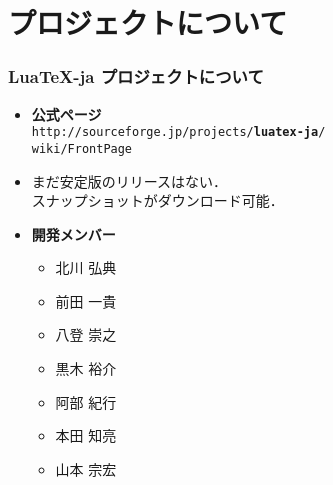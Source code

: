 \documentclass[notheorems,12pt,hyperref={unicode=true}]{beamer}
\def\alert#1{{\color{red}\bfseries#1}}
\begin{document}
\section{プロジェクトについて}
\begin{frame}
\frametitle{Lua\TeX-ja プロジェクトについて}
\begin{itemize}
\item \textbf{公式ページ}\\
{\tt http://sourceforge.jp/projects/\alert{luatex-ja}/\\\hfill wiki/FrontPage}
\item まだ安定版のリリースはない．\\スナップショットがダウンロード可能．
\item \textbf{開発メンバー}
\begin{itemize}
\item 北川 弘典
\item 前田 一貴
\item 八登 崇之
\item 黒木 裕介
\item 阿部 紀行
\item 本田 知亮
\item 山本 宗宏
\end{itemize}
\end{itemize}
\end{frame}
\end{document}
